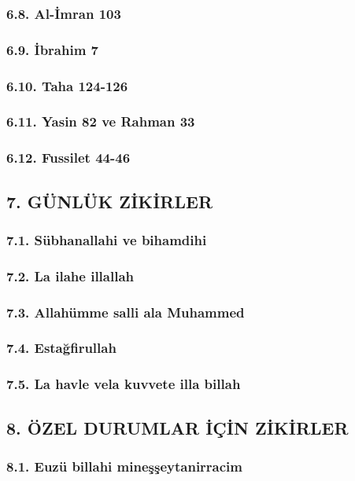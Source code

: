 \documentclass[12pt,a4paper]{article}
\begin{document}
\subsubsection{6.8. Al-İmran 103}
\subsubsection{6.9. İbrahim 7}
\subsubsection{6.10. Taha 124-126}
\subsubsection{6.11. Yasin 82 ve Rahman 33}
\subsubsection{6.12. Fussilet 44-46}
\subsection{7. GÜNLÜK ZİKİRLER}
\subsubsection{7.1. Sübhanallahi ve bihamdihi}
\subsubsection{7.2. La ilahe illallah}
\subsubsection{7.3. Allahümme salli ala Muhammed}
\subsubsection{7.4. Estağfirullah}
\subsubsection{7.5. La havle vela kuvvete illa billah}
\subsection{8. ÖZEL DURUMLAR İÇİN ZİKİRLER}
\subsubsection{8.1. Euzü billahi mineşşeytanirracim}
\end{document}
